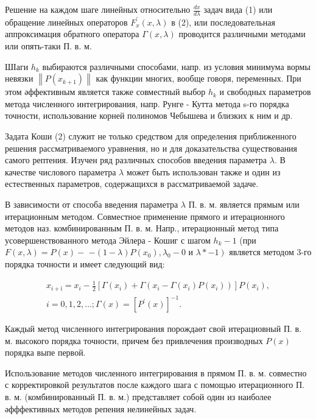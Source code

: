 \documentclass[10pt]{article}
\begin{document}
Решение на каждом шаге линейных относительно $\frac{d x}{d \lambda}$ задач вида (1) или обращение линейных операторов $F_{x}^{\prime}(x, \lambda)$ в (2), или последовательная аппроксимация обратного оператора $\Gamma(x, \lambda)$ проводнтся различными методами или опять-таки П. в. м.

ШІаги $h_{k}$ выбираются различными способами, напр. из условия минимума вормы невязки $\left\|P\left(x_{k+1}\right)\right\|$ как функции многих, вообще говоря, переменных. При этом әффективным является также совместный выбор $h_{k}$ и свободных параметров метода численного интегрирования, напр. Рунге - Кутта метода s-го порядка точности, использование корней полиномов Чебышева и близких к ним и др.

Задата Коши (2) служит не только средством для определения приближенного решения рассматриваемого уравнения, но и для доказательства существования самого рептения. Изучен ряд различных способов введения параметра $\lambda$. В качестве числового параметра $\lambda$ может быть использован также и один из естественных параметров, содержащихся в рассматриваемой задаче.

В зависимости от способа введения параметра $\lambda$ П. в. м. является прямым или итерационным методом. Совместное применение прямого и итерационного методов наз. комбинированным П. в. м. Напр., итерационныӥ метод типа усовершенствованного метода Эйлера - Кошиг с шагом $h_{k}-1$ (при $F(x, \lambda)=P(x)-$ $-(1-\lambda) P\left(x_{0}\right), \lambda_{0}-0$ и $\left.\lambda *-1\right)$ является методом 3-го порядка точности и имеет следующий вид:

\[
\begin{gathered}
x_{i+\mathrm{i}}=x_{i}-\frac{1}{2}\left[\Gamma\left(x_{i}\right)+\Gamma\left(x_{i}-\Gamma\left(x_{i}\right) P\left(x_{i}\right)\right)\right] P\left(x_{i}\right), \\
i=0,1,2, \ldots ; \Gamma(x)=\left[P^{\prime}(x)\right]^{-1} .
\end{gathered}
\]

Каждый метод численного интегрирования порождаөт свой итерациовный П. в. м. высокого порядка точности, причем без привлечения производных $P(x)$ порядка выпе первой.

Использование методов численного интегрирования в прямом П. в. м. совместно с корректировкой результатов после каждого шага с помощью итерационного П. в. м. (комбинированный П. в. м.) представляет собой один из наиболее әфффективных методов репения нелинейных задач.
\end{document}
